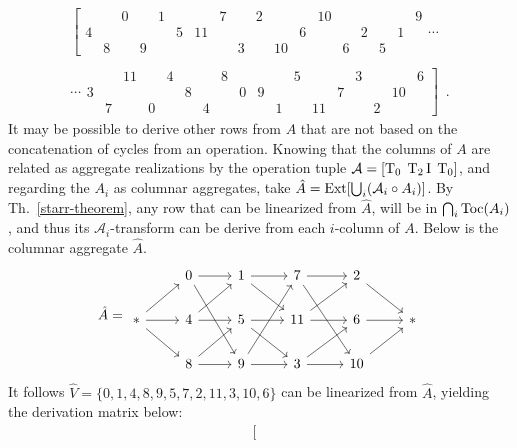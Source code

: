 \begin{example}
    \begin{multline}
        \left[
        \begin{array}{cccccccccccc|cccccc}
        	&& 0 && 1 &&& 7 && 2 && & 10 &&&&& 9 \\
        	4 &&&&& 5 & 11 &&&&& 6 & && 2 && 1 & \\
        	& 8 && 9 &&&&& 3 && 10 & & & 6 && 5 &&
        \end{array}
        \right. \cdots \\\\
        \cdots \left.
        \begin{array}{cccccc|cccccccccccc}
        	&& 11 && 4 & & & 8 &&&& 5 &&& 3 &&& 6 \\
        	3 &&&&& 8 & && 0 & 9 &&&& 7 &&& 10 & \\
        	& 7 && 0 && & 4 &&&& 1 && 11 &&& 2 &&
        \end{array}
        \right] \enspace.
    \end{multline}
    It may be possible to derive other rows from $A$ that are not based on the concatenation of cycles from an operation. Knowing that the columns of $A$ are related as aggregate realizations by the operation tuple $\mathcal{A} = [\operatorname{T}_0 \; \operatorname{T}_2\operatorname{I} \; \operatorname{T}_0]$, and regarding the $A_i$ as columnar aggregates, take $\hat{A} = \operatorname{Ext}[\bigcup_i(\mathcal{A}_i \circ A_i)]$. By Th.~\ref{starr-theorem}, any row that can be linearized from $\hat{A}$, will be in $\bigcap_i \operatorname{Toc}(A_i)$, and thus its $\mathcal{A}_i$-transform can be derive from each $i$-column of $A$. Below is the columnar aggregate $\hat{A}$.
    \begin{equation}
        \hat{A} = \begin{tikzcd}
            & 0 \arrow[r] \arrow[ddr] & 1 \arrow[r] \arrow[dr] & 7 \arrow[r] \arrow[ddr] & 2 \arrow[dr] & \\
            * \arrow[r] \arrow[dr] \arrow[ur] & 4 \arrow[r] \arrow[ur] & 5 \arrow[r] \arrow[dr] & 11 \arrow[r] \arrow[ur] & 6 \arrow[r] & * \\
            & 8 \arrow[r] \arrow[ur] & 9 \arrow[r] \arrow[uur] & 3 \arrow[r] \arrow[ur] & 10 \arrow[ur] &
        \end{tikzcd}
    \end{equation}
    It follows $\hat{V} = \{ 0, 1, 4, 8, 9, 5, 7, 2, 11, 3, 10, 6 \}$ can be linearized from $\hat{A}$, yielding the derivation matrix below:
    \begin{multline}
        \left[
        \begin{array}{cccccccccccc|cccccc}

\end{array}
\end{multline}
\end{example}
